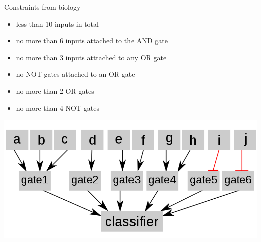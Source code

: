 \documentclass[10pt,dvipsnames]{beamer}
\begin{document}
\begin{frame}{Constraints from biology}
\begin{itemize}
 \item less than 10 inputs in total
 \item no more than 6 inputs attached to the AND gate
 \item no more than 3 inputs atttached to any OR gate
 \item no NOT gates attached to an OR gate
 \item no more than 2 OR gates
 \item no more than 4 NOT gates
\end{itemize}
\begin{center}
\includegraphics[scale=0.3]{classifier_max.png}
\end{center}
\end{frame}
\end{document}
